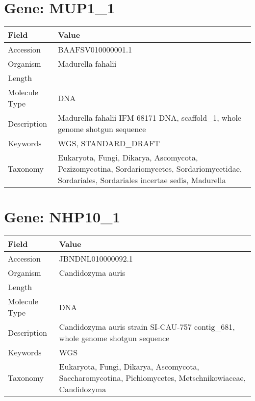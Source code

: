 \documentclass[10pt]{article}
\begin{document}
\section{Gene: MUP1\_1}
{\footnotesize
\begin{longtable}{>{\raggedright\arraybackslash}p{4.5cm} >{\raggedright\arraybackslash}p{11.5cm}}
\textbf{Field} & \textbf{Value} \\
\hline
Accession & BAAFSV010000001.1 \\
Organism & Madurella fahalii \\
Length & 10295420 \\
Molecule Type & DNA \\
Description & Madurella fahalii IFM 68171 DNA, scaffold\_1, whole genome shotgun sequence \\
Keywords & WGS, STANDARD\_DRAFT \\
Taxonomy & Eukaryota, Fungi, Dikarya, Ascomycota, Pezizomycotina, Sordariomycetes, Sordariomycetidae, Sordariales, Sordariales incertae sedis, Madurella \\
\end{longtable}
}

\vspace{1em}
\section{Gene: NHP10\_1}
{\footnotesize
\begin{longtable}{>{\raggedright\arraybackslash}p{4.5cm} >{\raggedright\arraybackslash}p{11.5cm}}
\textbf{Field} & \textbf{Value} \\
\hline
Accession & JBNDNL010000092.1 \\
Organism & Candidozyma auris \\
Length & 503786 \\
Molecule Type & DNA \\
Description & Candidozyma auris strain SI-CAU-757 contig\_681, whole genome shotgun sequence \\
Keywords & WGS \\
Taxonomy & Eukaryota, Fungi, Dikarya, Ascomycota, Saccharomycotina, Pichiomycetes, Metschnikowiaceae, Candidozyma \\
\end{longtable}
}

\vspace{1em}
\end{document}
